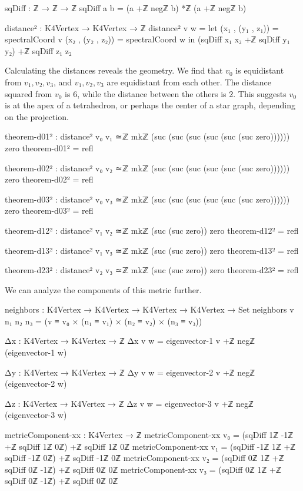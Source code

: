 \documentclass[11pt,a4paper]{book}
\begin{document}
\begin{code}
sqDiff : ℤ → ℤ → ℤ
sqDiff a b = (a +ℤ negℤ b) *ℤ (a +ℤ negℤ b)

distance² : K4Vertex → K4Vertex → ℤ
distance² v w = 
  let (x₁ , (y₁ , z₁)) = spectralCoord v
      (x₂ , (y₂ , z₂)) = spectralCoord w
  in (sqDiff x₁ x₂ +ℤ sqDiff y₁ y₂) +ℤ sqDiff z₁ z₂

\end{code}

Calculating the distances reveals the geometry. We find that $v_0$ is equidistant from $v_1, v_2, v_3$, and $v_1, v_2, v_3$ are equidistant from each other. The distance squared from $v_0$ is 6, while the distance between the others is 2. This suggests $v_0$ is at the apex of a tetrahedron, or perhaps the center of a star graph, depending on the projection.

\begin{code}
theorem-d01² : distance² v₀ v₁ ≃ℤ mkℤ (suc (suc (suc (suc (suc (suc zero)))))) zero
theorem-d01² = refl

theorem-d02² : distance² v₀ v₂ ≃ℤ mkℤ (suc (suc (suc (suc (suc (suc zero)))))) zero
theorem-d02² = refl

theorem-d03² : distance² v₀ v₃ ≃ℤ mkℤ (suc (suc (suc (suc (suc (suc zero)))))) zero
theorem-d03² = refl

theorem-d12² : distance² v₁ v₂ ≃ℤ mkℤ (suc (suc zero)) zero
theorem-d12² = refl

theorem-d13² : distance² v₁ v₃ ≃ℤ mkℤ (suc (suc zero)) zero
theorem-d13² = refl

theorem-d23² : distance² v₂ v₃ ≃ℤ mkℤ (suc (suc zero)) zero
theorem-d23² = refl
\end{code}

We can analyze the components of this metric further.

\begin{code}
neighbors : K4Vertex → K4Vertex → K4Vertex → K4Vertex → Set
neighbors v n₁ n₂ n₃ = (v ≡ v₀ × (n₁ ≡ v₁) × (n₂ ≡ v₂) × (n₃ ≡ v₃))

Δx : K4Vertex → K4Vertex → ℤ
Δx v w = eigenvector-1 v +ℤ negℤ (eigenvector-1 w)

Δy : K4Vertex → K4Vertex → ℤ
Δy v w = eigenvector-2 v +ℤ negℤ (eigenvector-2 w)

Δz : K4Vertex → K4Vertex → ℤ
Δz v w = eigenvector-3 v +ℤ negℤ (eigenvector-3 w)

metricComponent-xx : K4Vertex → ℤ
metricComponent-xx v₀ = (sqDiff 1ℤ -1ℤ +ℤ sqDiff 1ℤ 0ℤ) +ℤ sqDiff 1ℤ 0ℤ
metricComponent-xx v₁ = (sqDiff -1ℤ 1ℤ +ℤ sqDiff -1ℤ 0ℤ) +ℤ sqDiff -1ℤ 0ℤ
metricComponent-xx v₂ = (sqDiff 0ℤ 1ℤ +ℤ sqDiff 0ℤ -1ℤ) +ℤ sqDiff 0ℤ 0ℤ
metricComponent-xx v₃ = (sqDiff 0ℤ 1ℤ +ℤ sqDiff 0ℤ -1ℤ) +ℤ sqDiff 0ℤ 0ℤ
\end{code}
\end{document}
